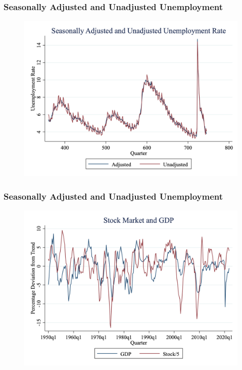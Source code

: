 \documentclass{beamer}
\begin{document}
\begin{frame}
\frametitle[alignment=center]{Seasonally Adjusted and Unadjusted Unemployment}
\begin{figure}
\centering
\includegraphics[scale=0.25]{Figures/Fig_3pt16.png}
\end{figure}
\end{frame}

\begin{frame}
\frametitle[alignment=center]{Seasonally Adjusted and Unadjusted Unemployment}
\begin{figure}
\centering
\includegraphics[scale=0.25]{Figures/StockvsGDP.png}
\end{figure}
\end{frame}
\end{document}

